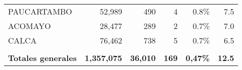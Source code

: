 \begin{tabular}{lrrrrr}
	\cellcolor[HTML]{9AFF99}PAUCARTAMBO   & 52,989                                                         & 490                                                                  & 4                                                              & 0.8\%                                                                  & 7.5                                                                                                                                \\
	\cellcolor[HTML]{9AFF99}ACOMAYO       & 28,477                                                         & 289                                                                  & 2                                                              & 0.7\%                                                                  & 7.0                                                                                                                                \\
	\cellcolor[HTML]{9AFF99}CALCA         & 76,462                                                         & 738                                                                  & 5                                                              & 0.7\%                                                                  & 6.5                                                                                                                                \\
	&                                                                &                                                                      &                                                                &                                                                        &                                                                                                                                    \\
	\rowcolor[HTML]{ECF4FF} 
	\textbf{Totales generales}            & \textbf{1,357,075}                                             & \textbf{36,010}                                                      & \textbf{169}                                                   & \textbf{0,47\%}                                                        & \textbf{12.5}                                                                                                                     
\end{tabular}